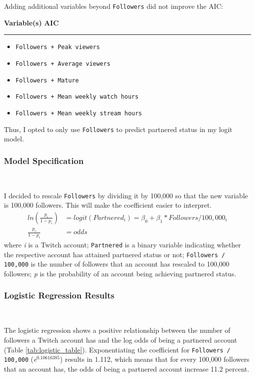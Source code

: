 \documentclass[12pt]{article}
\begin{document}
\noindent Adding additional variables beyond \texttt{Followers} did not improve the AIC:

\noindent \textbf{Variable(s)} \hfill \textbf{AIC}
\hspace{0.4em}
\hrule
\begin{itemize}
    \item \texttt{Followers + Peak viewers} 
    \item \texttt{Followers + Average viewers} 
    \item \texttt{Followers + Mature} 
    \item \texttt{Followers + Mean weekly watch hours} 
    \item \texttt{Followers + Mean weekly stream hours} 
\end{itemize}
Thus, I opted to only use \texttt{Followers} to predict partnered status in my logit model.

\subsubsection{Model Specification}\

I decided to rescale \texttt{Followers} by dividing it by 100,000 so that the new variable is 100,000 followers. This will make the coefficient easier to interpret.
\begin{equation}
\begin{aligned}
	ln(\frac{p_{i}}{1-p_{i}}) & = logit(Partnered_{i})  = \beta_{0} + \beta_{1} \ast Followers/100,000_{i} \\
	\frac{p_{i}}{1-p_{i}} & = odds
\end{aligned}
\end{equation}
where \emph{i} is a Twitch account; \texttt{Partnered} is a binary variable indicating whether the respective account has attained partnered status or not; \texttt{Followers / 100,000} is the number of followers that an account has rescaled to 100,000 followers; \emph{p} is the probability of an account being achieving partnered status.

\subsubsection{Logistic Regression Results}\

The logistic regression shows a positive relationship between the number of followers a Twitch account has and the log odds of being a partnered account (Table \ref{tab:logistic_table}). Exponentiating the coefficient for \texttt{Followers / 100,000} (\emph{e}$^{0.10616385}$)  results in 1.112, which means that for every 100,000 followers that an account has, the odds of being a partnered account increase 11.2 percent.
\end{document}
